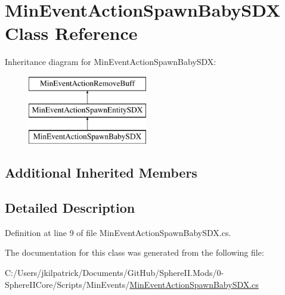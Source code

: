 \hypertarget{class_min_event_action_spawn_baby_s_d_x}{}\section{Min\+Event\+Action\+Spawn\+Baby\+S\+DX Class Reference}
\label{class_min_event_action_spawn_baby_s_d_x}
Inheritance diagram for Min\+Event\+Action\+Spawn\+Baby\+S\+DX\+:\begin{figure}[H]
\begin{center}
\leavevmode
\includegraphics[height=3.000000cm]{class_min_event_action_spawn_baby_s_d_x}
\end{center}
\end{figure}
\subsection*{Additional Inherited Members}


\subsection{Detailed Description}


Definition at line 9 of file Min\+Event\+Action\+Spawn\+Baby\+S\+D\+X.\+cs.



The documentation for this class was generated from the following file\+:\begin{DoxyCompactItemize}
\item 
C\+:/\+Users/jkilpatrick/\+Documents/\+Git\+Hub/\+Sphere\+I\+I.\+Mods/0-\/\+Sphere\+I\+I\+Core/\+Scripts/\+Min\+Events/\mbox{\hyperlink{_min_event_action_spawn_baby_s_d_x_8cs}{Min\+Event\+Action\+Spawn\+Baby\+S\+D\+X.\+cs}}\end{DoxyCompactItemize}
